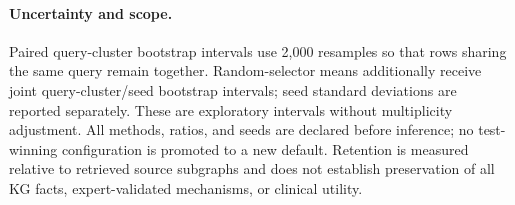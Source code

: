 \paragraph{Uncertainty and scope.}
Paired query-cluster bootstrap intervals use 2,000 resamples so that rows sharing
the same query remain together. Random-selector means additionally receive
joint query-cluster/seed bootstrap intervals; seed standard deviations are
reported separately. These are exploratory intervals without multiplicity
adjustment. All methods, ratios, and seeds are declared before inference; no
test-winning configuration is promoted to a new default. Retention is measured
relative to retrieved source subgraphs and does not establish preservation of
all KG facts, expert-validated mechanisms, or clinical utility.
